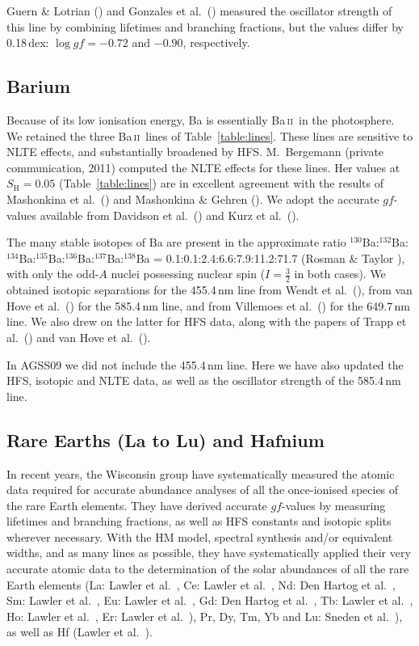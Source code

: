 \documentclass[traditabstract]{aa}
\newcommand{\altbaii}{Ba\,\textsc{ii}}
\newcommand{\baii}{\altbaii\ }
\begin{document}
Guern \& Lotrian (\cite{guer}) and Gonzales et al.\ (\cite{gonz2}) measured the 
oscillator strength of this line by combining lifetimes and branching fractions, 
but the values differ by 0.18\,dex: $\log gf=-0.72$ and $-0.90$, respectively.

\subsection{Barium}
Because of its low ionisation energy, Ba is essentially \baii in the photosphere. We retained the three \baii lines of Table~\ref{table:lines}.  These lines are sensitive to NLTE effects, and substantially broadened by HFS.  M.\ Bergemann (private communication, 2011) computed the NLTE effects for these lines.  Her values at $S_\mathrm{H}=0.05$ (Table~\ref{table:lines}) are in excellent agreement with the results of Mashonkina et al.\ (\cite{mash3}) and Mashonkina \& Gehren (\cite{mash2}).  We adopt the accurate $gf$-values available from Davidson et al.\ (\cite{davi}) and Kurz et al.\ (\cite{Kurz}).

The many stable isotopes of Ba are present in the approximate ratio $^{130}$Ba:$^{132}$Ba:$^{134}$Ba:$^{135}$Ba:$^{136}$Ba:$^{137}$Ba:$^{138}$Ba = 0.1:0.1:2.4:6.6:7.9:11.2:71.7 (Rosman \& Taylor \cite{IUPAC98}), with only the odd-$A$ nuclei possessing nuclear spin ($I=\frac32$ in both cases).  We obtained isotopic separations for the 455.4\,nm line from Wendt et al.\ (\cite{Wendt84}), from van Hove et al.\ (\cite{vanhove}) for the 585.4\,nm line, and from Villemoes et al.\ (\cite{villemoes}) for the 649.7\,nm line.  We also drew on the latter for HFS data, along with the papers of Trapp et al.\ (\cite{trapp}) and van Hove et al.\ (\cite{vanhove2}).

In AGSS09 we did not include the 455.4\,nm line.  Here we have also updated the HFS, isotopic and NLTE data, as well as the oscillator strength of the 585.4\,nm line.

\subsection{Rare Earths (La to Lu) and Hafnium}
\label{rare_gfs}
In recent years, the Wisconsin group have systematically measured the atomic data required for accurate abundance analyses of all the once-ionised species of the rare Earth elements. They have derived accurate $gf$-values by measuring lifetimes and branching fractions, as well as HFS constants and isotopic splits wherever necessary. With the HM model, spectral synthesis and/or equivalent widths, and as many lines as possible, they have systematically applied their very accurate atomic data to the determination of the solar abundances of all the rare Earth elements (La: Lawler et al.\ \cite {law1}, Ce: Lawler et al.\ \cite{law2}, Nd: Den Hartog et al.\ \cite{den1}, Sm: Lawler et al.\ \cite{law3}, Eu: Lawler et al.\ \cite{law4}, Gd: Den Hartog et al.\ \cite{den2}, Tb: Lawler et al.\ \cite{law5}, Ho: Lawler et al.\ \cite{law6}, Er: Lawler et al.\ \cite{law7}), Pr, Dy, Tm, Yb and Lu: Sneden et al.\ \cite{sned1}), as well as Hf (Lawler et al.\ \cite{law8}).
\end{document}
